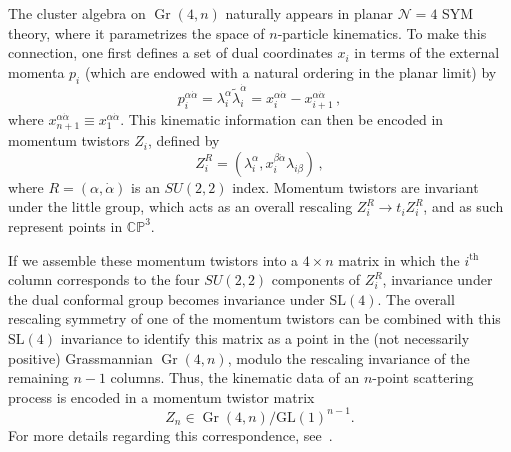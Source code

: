 \documentclass[11pt]{article}
\DeclareMathOperator{\Gr}{Gr}
\begin{document}

The cluster algebra on $\Gr(4,n)$ naturally appears in planar $\mathcal{N}=4$ SYM theory, where it parametrizes the space of $n$-particle kinematics. To make this connection, one first defines a set of dual coordinates $x_i$ in terms of the external momenta $p_i$ (which are endowed with a natural ordering in the planar limit) by
\begin{equation}
p_i^{\alpha \dot \alpha} = \lambda_i^\alpha \tilde \lambda_i^{\dot \alpha} = x_i^{\alpha \dot \alpha} - x_{i+1}^{\alpha \dot \alpha} \, , \label{eq:dual_coordiantes}
\end{equation}
where $x_{n+1}^{\alpha \dot \alpha} \equiv x_1^{\alpha \dot \alpha}$. This kinematic information can then be encoded in momentum twistors $Z_i$, defined by
\begin{equation}
Z^R_i = (\lambda_i^\alpha, x_i^{\beta \dot \alpha} \lambda_{i \beta}) \, ,
\end{equation}
where $R = (\alpha, \dot \alpha)$ is an $SU(2,2)$ index. Momentum twistors are invariant under the little group, which acts as an overall rescaling $Z_i^R \rightarrow  t_i Z_i^R$, and as such represent points in $\mathbb{CP}^3$. 

If we assemble these momentum twistors into a $4 \times n$ matrix in which the $i^\text{th}$ column corresponds to the four $SU(2,2)$ components of $Z_i^R$, invariance under the dual conformal group becomes invariance under $\text{SL}(4)$. The overall rescaling symmetry of one of the momentum twistors can be combined with this $\text{SL}(4)$ invariance to identify this matrix as a point in the (not necessarily positive) Grassmannian $\Gr(4,n)$, modulo the rescaling invariance of the remaining $n-1$ columns. Thus, the kinematic data of an $n$-point scattering process is encoded in a momentum twistor matrix
\begin{equation}
Z_n \in \Gr(4,n)/\text{GL}(1)^{n-1}. \label{eq:gr4n_momentum_twistor}
\end{equation}
For more details regarding this correspondence, see~\cite{ArkaniHamed:2012nw,Golden:2013xva}. 
\end{document}
